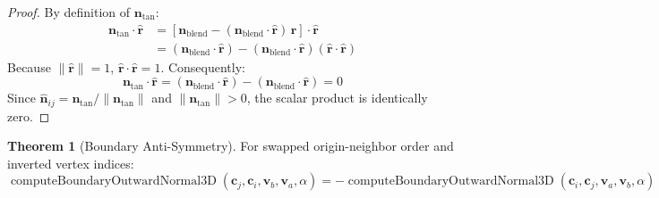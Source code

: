 \documentclass[11pt,a4paper]{article}
\theoremstyle{definition}
\newtheorem{theorem}{Theorem}
\begin{document}
\begin{proof}
By definition of $\mathbf{n}_{\text{tan}}$:
\begin{align*}
    \mathbf{n}_{\text{tan}} \cdot \hat{\mathbf{r}} &= \left[\mathbf{n}_{\text{blend}} - (\mathbf{n}_{\text{blend}} \cdot \hat{\mathbf{r}})\,\hat{\mathbf{r}}\right] \cdot \hat{\mathbf{r}} \\
    &= (\mathbf{n}_{\text{blend}} \cdot \hat{\mathbf{r}}) - (\mathbf{n}_{\text{blend}} \cdot \hat{\mathbf{r}})(\hat{\mathbf{r}} \cdot \hat{\mathbf{r}})
\end{align*}
Because $\|\hat{\mathbf{r}}\| = 1$, $\hat{\mathbf{r}} \cdot \hat{\mathbf{r}} = 1$. Consequently:
\begin{equation*}
    \mathbf{n}_{\text{tan}} \cdot \hat{\mathbf{r}} = (\mathbf{n}_{\text{blend}} \cdot \hat{\mathbf{r}}) - (\mathbf{n}_{\text{blend}} \cdot \hat{\mathbf{r}}) = 0
\end{equation*}
Since $\hat{\mathbf{n}}_{ij} = \mathbf{n}_{\text{tan}} / \|\mathbf{n}_{\text{tan}}\|$ and $\|\mathbf{n}_{\text{tan}}\| > 0$, the scalar product is identically zero.
\end{proof}

\begin{theorem}[Boundary Anti-Symmetry]
For swapped origin-neighbor order and inverted vertex indices:
\begin{equation}
    \operatorname{computeBoundaryOutwardNormal3D}(\mathbf{c}_j, \mathbf{c}_i, \mathbf{v}_b, \mathbf{v}_a, \alpha) = -\operatorname{computeBoundaryOutwardNormal3D}(\mathbf{c}_i, \mathbf{c}_j, \mathbf{v}_a, \mathbf{v}_b, \alpha)
\end{equation}
\end{theorem}
\end{document}
